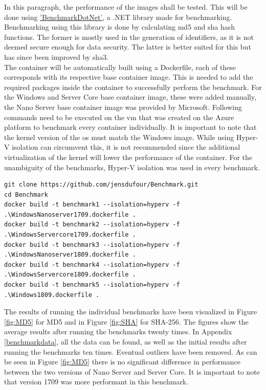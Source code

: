 In this paragraph, the performance of the images shall be tested. 
This will be done using \href{https://benchmarkdotnet.org/}{'BenchmarkDotNet'}, a .NET library made for benchmarking. \autocite{Akinshin2019} 
Benchmarking using this library is done by calculating \acrfull{md5} and \acrfull{sha} hash functions. 
The former is mostly used in the generation of identifiers, as it is not deemed secure enough for data security. 
The latter is better suited for this but has since been improved by \acrfull{sha3}. \autocite{Enkov2017}
\\
The container will be automatically built using a Dockerfile, each of these corresponds with its respective base container image. 
This is needed to add the required packages inside the container to successfully perform the benchmark. 
For the Windows and Server Core base container image, these were added manually, the Nano Server base container image was provided by Microsoft. 
Following commands need to be executed on the \acrshort{vm} that was created on the Azure platform to benchmark every container individually. 
It is important to note that the kernel version of the \acrshort{os} must match the Windows image. 
While using Hyper-V isolation can circumvent this, it is not recommended since the additional virtualization of the kernel will lower the performance of the container. 
For the unambiguity of the benchmarks, Hyper-V isolation was used in every benchmark.

\begin{lstlisting}[breaklines]
git clone https://github.com/jensdufour/Benchmark.git
cd Benchmark	
docker build -t benchmark1 --isolation=hyperv -f .\WindowsNanoserver1709.dockerfile .
docker build -t benchmark2 --isolation=hyperv -f .\WindowsServercore1709.dockerfile .
docker build -t benchmark3 --isolation=hyperv -f .\WindowsNanoserver1809.dockerfile .
docker build -t benchmark4 --isolation=hyperv -f .\WindowsServercore1809.dockerfile .
docker build -t benchmark5 --isolation=hyperv -f .\Windows1809.dockerfile .
\end{lstlisting}

The results of running the individual benchmarks have been visualized in Figure \ref{fig:MD5} for MD5 and in Figure \ref{fig:SHA} for SHA-256. 
The figures show the average results after running the benchmarks twenty times. 
In Appendix \ref{benchmarkdata}, all the data can be found, as well as the initial results after running the benchmarks ten times. 
Eventual outliers have been removed. 
As can be seen in Figure \ref{fig:MD5} there is no significant difference in performance between the two versions of Nano Server and Server Core.
It is important to note that version 1709 was more performant in this benchmark. 

